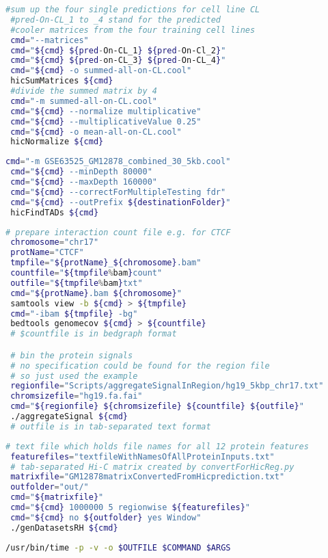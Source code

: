 \begin{appendices}
\begin{lstlisting}[language=bash, caption=compute mean prediction, label=list:methods:averagePredictions]
 #sum up the four single predictions for cell line CL
 #pred-On-CL_1 to _4 stand for the predicted
 #cooler matrices from the four training cell lines
 cmd="--matrices"
 cmd="${cmd} ${pred-On-CL_1} ${pred-On-Cl_2}"
 cmd="${cmd} ${pred-on-CL_3} ${pred-On-CL_4}"
 cmd="${cmd} -o summed-all-on-CL.cool"
 hicSumMatrices ${cmd}
 #divide the summed matrix by 4
 cmd="-m summed-all-on-CL.cool"
 cmd="${cmd} --normalize multiplicative"
 cmd="${cmd} --multiplicativeValue 0.25"
 cmd="${cmd} -o mean-all-on-CL.cool"
 hicNormalize ${cmd}
\end{lstlisting}

\begin{lstlisting}[language=bash,caption=command for finding TADs on GM12878,label=methods:list:TADs]
 cmd="-m GSE63525_GM12878_combined_30_5kb.cool"
 cmd="${cmd} --minDepth 80000"
 cmd="${cmd} --maxDepth 160000"
 cmd="${cmd} --correctForMultipleTesting fdr"
 cmd="${cmd} --outPrefix ${destinationFolder}"
 hicFindTADs ${cmd}
\end{lstlisting}

\begin{lstlisting}[language=bash,caption=preparing inputs for HiC-Reg  (example),label=methods:list:hicregInputs]
 # prepare interaction count file e.g. for CTCF
 chromosome="chr17"
 protName="CTCF"
 tmpfile="${protName}_${chromosome}.bam"
 countfile="${tmpfile%bam}count"
 outfile="${tmpfile%bam}txt"
 cmd="${protName}.bam ${chromosome}"
 samtools view -b ${cmd} > ${tmpfile}
 cmd="-ibam ${tmpfile} -bg"
 bedtools genomecov ${cmd} > ${countfile}
 # $countfile is in bedgraph format

 # bin the protein signals
 # no specification could be found for the region file
 # so just used the example
 regionfile="Scripts/aggregateSignalInRegion/hg19_5kbp_chr17.txt"
 chromsizefile="hg19.fa.fai"
 cmd="${regionfile} ${chromsizefile} ${countfile} ${outfile}"
 ./aggregateSignal ${cmd}
 # outfile is in tab-separated text format
\end{lstlisting}

\begin{lstlisting}[language=bash,caption=computing window features for HiC-Reg (example),label=methods:list:hicregWindow]
 # text file which holds file names for all 12 protein features
 featurefiles="textfileWithNamesOfAllProteinInputs.txt"
 # tab-separated Hi-C matrix created by convertForHicReg.py
 matrixfile="GM12878matrixConvertedFromHicprediction.txt"
 outfolder="out/"
 cmd="${matrixfile}"
 cmd="${cmd} 1000000 5 regionwise ${featurefiles}"
 cmd="${cmd} no ${outfolder} yes Window"
 ./genDatasetsRH ${cmd}
\end{lstlisting}

\begin{lstlisting}[language=bash,caption=measuring resource consumption,label=methods:list:usrbintime]
 /usr/bin/time -p -v -o $OUTFILE $COMMAND $ARGS
\end{lstlisting}

\end{appendices}